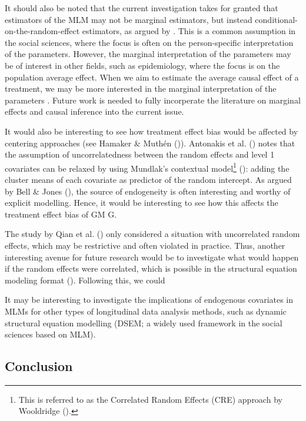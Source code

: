 \documentclass[
  11pt,
  a4paper,
]{article}
\begin{document}
It should also be noted that the current investigation takes for granted
that estimators of the MLM may not be marginal estimators, but instead
conditional-on-the-random-effect estimators, as argued by . This is a
common assumption in the social sciences, where the focus is often on
the person-specific interpretation of the parameters. However, the
marginal interpretation of the parameters may be of interest in other
fields, such as epidemiology, where the focus is on the population
average effect. When we aim to estimate the average causal effect of a
treatment, we may be more interested in the marginal interpretation of
the parameters . Future work is needed to fully incorperate the
literature on marginal effects and causal inference into the current
issue.

It would also be interesting to see how treatment effect bias would be
affected by centering approaches (see Hamaker \& Muthén
()). Antonakis et al.
() notes that the assumption of
uncorrelatedness between the random effects and level 1 covariates can
be relaxed by using Mundlak's contextual model\footnote{This is referred
  to as the Correlated Random Effects (CRE) approach by Wooldridge
  ().}
(): adding the cluster means of
each covariate as predictor of the random intercept. As argued by Bell
\& Jones (), the source of endogeneity is
often interesting and worthy of explicit modelling. Hence, it would be
interesting to see how this affects the treatment effect bias of GM G.

The study by Qian et al. () only considered
a situation with uncorrelated random effects, which may be restrictive
and often violated in practice. Thus, another interesting avenue for
future research would be to investigate what would happen if the random
effects were correlated, which is possible in the structural equation
modeling format ().
Following this, we could

It may be interesting to investigate the implications of endogenous
covariates in MLMs for other types of longitudinal data analysis
methods, such as dynamic structural equation modelling (DSEM; a widely
used framework in the social sciences based on MLM).

\subsection{Conclusion}\label{conclusion}
\end{document}
